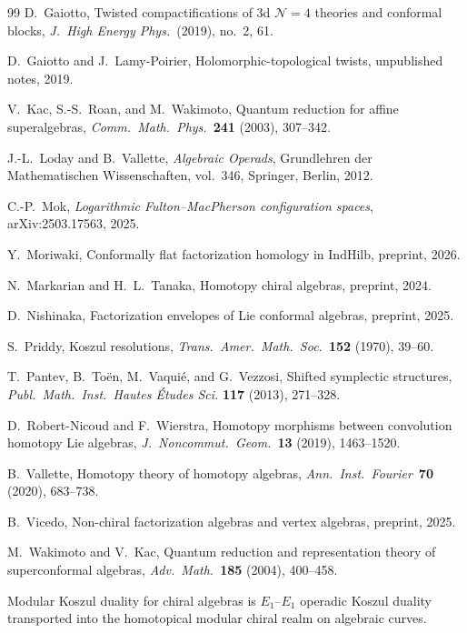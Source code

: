 \documentclass[11pt,reqno]{amsart}
\theoremstyle{definition}
\theoremstyle{remark}
\numberwithin{equation}{section}
\begin{document}
\begin{thebibliography}{99}
D.~Gaiotto,
Twisted compactifications of 3d
$\mathcal{N}=4$ theories and conformal blocks,
\textit{J.\ High Energy Phys.}\ (2019), no.~2, 61.

D.~Gaiotto and J.~Lamy-Poirier,
Holomorphic-topological twists,
unpublished notes, 2019.

V.~Kac, S.-S.~Roan, and M.~Wakimoto,
Quantum reduction for affine superalgebras,
\textit{Comm.\ Math.\ Phys.}~\textbf{241} (2003),
307--342.

J.-L.~Loday and B.~Vallette,
\textit{Algebraic Operads},
Grundlehren der Mathematischen Wissenschaften,
vol.~346, Springer, Berlin, 2012.

C.-P.~Mok,
\emph{Logarithmic Fulton--MacPherson configuration spaces},
arXiv:2503.17563, 2025.

Y.~Moriwaki,
Conformally flat factorization homology in
$\mathrm{IndHilb}$,
preprint, 2026.

N.~Markarian and H.~L.~Tanaka,
Homotopy chiral algebras,
preprint, 2024.

D.~Nishinaka,
Factorization envelopes of Lie conformal algebras,
preprint, 2025.

S.~Priddy,
Koszul resolutions,
\textit{Trans.\ Amer.\ Math.\ Soc.}~\textbf{152}
(1970), 39--60.

T.~Pantev, B.~To\"en, M.~Vaqui\'e, and G.~Vezzosi,
Shifted symplectic structures,
\textit{Publ.\ Math.\ Inst.\ Hautes \'Etudes Sci.}
\textbf{117} (2013), 271--328.

D.~Robert-Nicoud and F.~Wierstra,
Homotopy morphisms between convolution homotopy
Lie algebras,
\textit{J.\ Noncommut.\ Geom.}~\textbf{13} (2019),
1463--1520.

B.~Vallette,
Homotopy theory of homotopy algebras,
\textit{Ann.\ Inst.\ Fourier}~\textbf{70} (2020),
683--738.

B.~Vicedo,
Non-chiral factorization algebras and vertex algebras,
preprint, 2025.

M.~Wakimoto and V.~Kac,
Quantum reduction and representation theory
of superconformal algebras,
\textit{Adv.\ Math.}~\textbf{185} (2004), 400--458.

\end{thebibliography}

\bigskip
\noindent\hrulefill

\medskip
\noindent
Modular Koszul duality for chiral algebras is $E_1$--$E_1$
operadic Koszul duality transported into the homotopical
modular chiral realm on algebraic curves.
\end{document}
